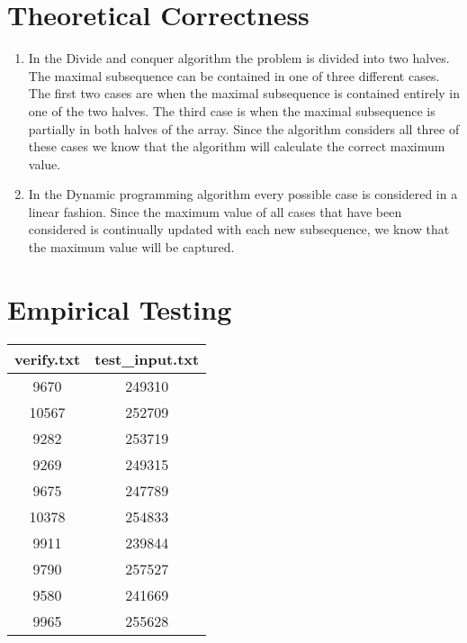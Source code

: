 \documentclass[12pt]{article}
\begin{document}
\section{Theoretical Correctness}
    \begin{enumerate}

    \item In the Divide and conquer algorithm the problem is divided into two
            halves.  The maximal subsequence can be contained in one of three
            different cases.  The first two cases are when the maximal
            subsequence is contained entirely in one of the two halves. The 
            third case is when the maximal subsequence is partially in both
            halves of the array.  Since the algorithm considers all three of
            these cases we know that the algorithm will calculate the correct
            maximum value.

    \item In the Dynamic programming algorithm every possible case is 
            considered in a linear fashion.  Since the maximum value of all
            cases that have been considered is continually updated with each
            new subsequence, we know that the maximum value will be captured.

    \end{enumerate}

\section*{Empirical Testing}

\begin{center}
\begin{tabular}{|c|c|}
\hline
verify.txt & test\_input.txt \\ \hline
9670  & 249310 \\ \hline
10567 & 252709 \\ \hline 
9282  & 253719 \\ \hline 
9269  & 249315 \\ \hline 
9675  & 247789 \\ \hline 
10378 & 254833 \\ \hline 
9911  & 239844 \\ \hline 
9790  & 257527 \\ \hline 
9580  & 241669 \\ \hline 
9965  & 255628 \\
\hline
\end{tabular}
\end{center}
\end{document}
